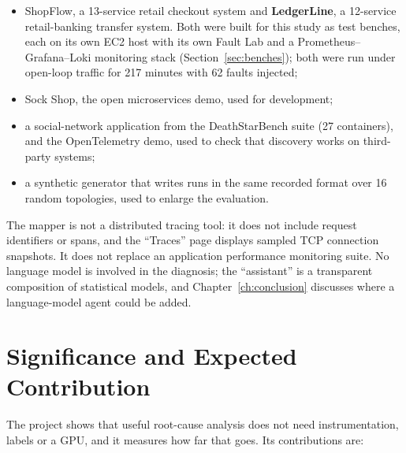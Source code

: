 \begin{itemize}
\item ShopFlow, a 13-service retail checkout system and \textbf{LedgerLine}, a 12-service retail-banking transfer system. Both were built for this study as test benches, each on its own EC2 host with its own Fault Lab and a Prometheus–Grafana–Loki monitoring stack (Section~\ref{sec:benches}); both were run under open-loop traffic for 217 minutes with 62 faults injected;
\item Sock Shop, the open microservices demo, used for development;
\item a social-network application from the DeathStarBench suite \cite{gan2019deathstar} (27 containers), and the OpenTelemetry demo, used to check that discovery works on third-party systems;
\item a synthetic generator that writes runs in the same recorded format over 16 random topologies, used to enlarge the evaluation.
\end{itemize}

The mapper is not a distributed tracing tool: it does not include request identifiers or spans, and the ``Traces'' page displays sampled TCP connection snapshots. It does not replace an application performance monitoring suite. No language model is involved in the diagnosis; the ``assistant'' is a transparent composition of statistical models, and Chapter~\ref{ch:conclusion} discusses where a language-model agent could be added.

\section{Significance and Expected Contribution}
The project shows that useful root-cause analysis does not need instrumentation, labels or a GPU, and it measures how far that goes. Its contributions are:

